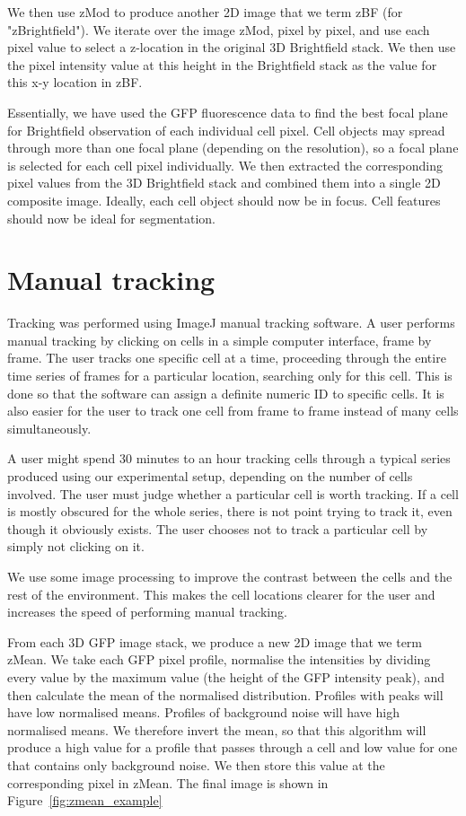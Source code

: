 We then use zMod to produce another 2D image that we term zBF (for "zBrightfield"). We iterate over the image zMod, pixel by pixel, and use each pixel value to select a z-location in the original 3D Brightfield stack. We then use the pixel intensity value at this height in the Brightfield stack as the value for this x-y location in zBF.

Essentially, we have used the GFP fluorescence data to find the best focal plane for Brightfield observation of each individual cell pixel. Cell objects may spread through more than one focal plane (depending on the resolution), so a focal plane is selected for each cell pixel individually. We then extracted the corresponding pixel values from the 3D Brightfield stack and combined them into a single 2D composite image. Ideally, each cell object should now be in focus. Cell features should now be ideal for segmentation.

\section{Manual tracking}

Tracking was performed using ImageJ manual tracking software. A user performs manual tracking by clicking on cells in a simple computer interface, frame by frame. The user tracks one specific cell at a time, proceeding through the entire time series of frames for a particular location, searching only for this cell. This is done so that the software can assign a definite numeric ID to specific cells. It is also easier for the user to track one cell from frame to frame instead of many cells simultaneously.

A user might spend 30 minutes to an hour tracking cells through a typical series produced using our experimental setup, depending on the number of cells involved. The user must judge whether a particular cell is worth tracking. If a cell is mostly obscured for the whole series, there is not point trying to track it, even though it obviously exists. The user chooses not to track a particular cell by simply not clicking on it.

We use some image processing to improve the contrast between the cells and the rest of the environment. This makes the cell locations clearer for the user and increases the speed of performing manual tracking.

From each 3D GFP image stack, we produce a new 2D image that we term zMean. We take each GFP pixel profile, normalise the intensities by dividing every value by the maximum value (the height of the GFP intensity peak), and then calculate the mean of the normalised distribution. Profiles with peaks will have low normalised means. Profiles of background noise will have high normalised means. We therefore invert the mean, so that this algorithm will produce a high value for a profile that passes through a cell and low value for one that contains only background noise. We then store this value at the corresponding pixel in zMean. The final image is shown in Figure~\ref{fig:zmean_example}


